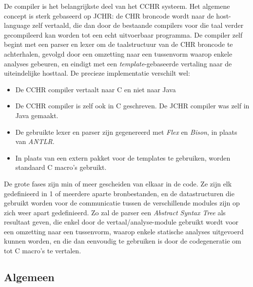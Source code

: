 De compiler is het belangrijkste deel van het CCHR systeem. Het algemene concept is sterk gebaseerd op JCHR: de CHR broncode wordt naar de host-language zelf vertaald, die dan door de bestaande compilers voor die taal verder gecompileerd kan worden tot een echt uitvoerbaar programma. De compiler zelf begint met een parser en lexer om de taalstructuur van de CHR broncode te achterhalen, gevolgd door een omzetting naar een tussenvorm waarop enkele analyses gebeuren, en eindigt met een {\em template}-gebaseerde vertaling naar de uiteindelijke hosttaal. De precieze implementatie verschilt wel: \begin{itemize}
  \item De CCHR compiler vertaalt naar C en niet naar Java
  \item De CCHR compiler is zelf ook in C geschreven. De JCHR compiler was zelf in Java gemaakt.
  \item De gebruikte lexer en parser zijn gegenereerd met {\em Flex} en {\em Bison}, in plaats van {\em ANTLR}.
  \item In plaats van een extern pakket voor de templates te gebruiken, worden standaard C macro's gebruikt.
 \end{itemize}
 
De grote fases zijn min of meer gescheiden van elkaar in de code. Ze zijn elk gedefinieerd in 1 of meerdere aparte bronbestanden, en de datastructuren die gebruikt worden voor de communicatie tussen de verschillende modules zijn op zich weer apart gedefinieerd. Zo zal de parser een {\em Abstract Syntax Tree} als resultaat geven, die enkel door de vertaal/analyse-module gebruikt wordt voor een omzetting naar een tussenvorm, waarop enkele statische analyses uitgevoerd kunnen worden, en die dan eenvoudig te gebruiken is door de codegeneratie om tot C macro's te vertalen.

\subsection{Algemeen} \label{sec:comp-werking}

